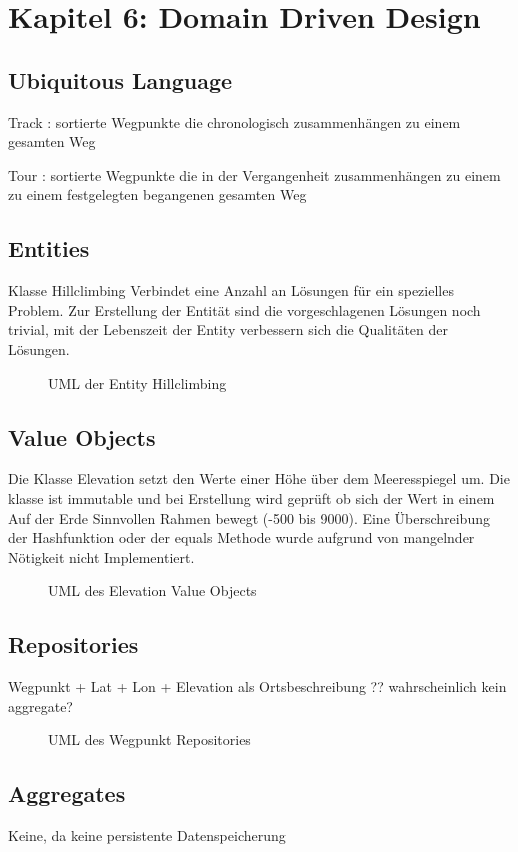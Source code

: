 \section{Kapitel 6: Domain Driven Design}

\subsection{Ubiquitous Language}

Track : sortierte Wegpunkte die chronologisch zusammenhängen zu einem gesamten Weg

Tour : sortierte Wegpunkte die in der Vergangenheit zusammenhängen zu einem zu einem festgelegten begangenen gesamten Weg

\subsection{Entities}

Klasse Hillclimbing Verbindet eine Anzahl an Lösungen für ein spezielles Problem. 
Zur Erstellung der Entität sind die vorgeschlagenen Lösungen noch trivial, mit der Lebenszeit der Entity verbessern sich die Qualitäten der Lösungen.

\begin{figure}[h]
  \centering
  
  \caption{UML der Entity Hillclimbing}
\end{figure}

\subsection{Value Objects}

Die Klasse Elevation setzt den Werte einer Höhe über dem Meeresspiegel um. Die klasse ist immutable und bei Erstellung wird geprüft ob sich der Wert in einem Auf der Erde Sinnvollen Rahmen bewegt (-500 bis 9000). 
Eine Überschreibung der Hashfunktion oder der equals Methode wurde aufgrund von mangelnder Nötigkeit nicht Implementiert.


\begin{figure}[h]
  \centering
  
  \caption{UML des Elevation Value Objects}
\end{figure}

\subsection{Repositories}

Wegpunkt + Lat + Lon + Elevation als Ortsbeschreibung ?? wahrscheinlich kein aggregate?

\begin{figure}[h]
  \centering
  
  \caption{UML des Wegpunkt Repositories}
\end{figure}

\subsection{Aggregates}

Keine, da keine persistente Datenspeicherung